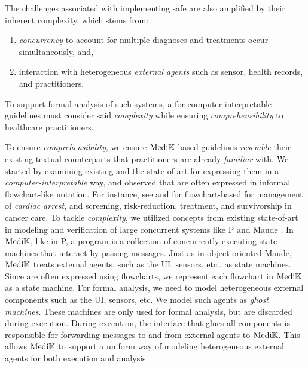 The challenges associated with implementing safe \CDSSs{} are
also amplified by their inherent complexity, which stems from:
\begin{enumerate}[label=(\roman*)]
  \item \emph{concurrency} to account for multiple diagnoses and treatments
    occur simultaneously, and,
  \item interaction with heterogeneous \emph{external agents} such as sensor,
    health records, and practitioners.
\end{enumerate}
To support formal analysis of such systems, a \DSL{} for
computer interpretable guidelines must consider said \emph{complexity}
while ensuring \emph{comprehensibility} to healthcare practitioners.

To ensure \emph{comprehensibility}, we ensure $\text{Medi}\mathbb{K}{}{}$-based guidelines \emph{resemble}
their existing textual counterparts that practitioners are already
\emph{familiar} with. We started by examining existing \BPGs{} and the
state-of-art \DSLs{} for expressing them in a \emph{computer-interpretable} way, and observed that
\BPGs{} are often expressed in informal flowchart-like notation. For instance,
see \cite{AHAFlowcharts} and \cite{CancerCareFlowcharts} for flowchart-based \BPGs{} for management of \emph{cardiac arrest}, and
screening, risk-reduction, treatment, and survivorship in cancer care.
To tackle \emph{complexity},
we utilized concepts from existing state-of-art in modeling
and verification of large concurrent systems like P \cite{DesaiPLDI13} and Maude
\cite{MaudeBook}.
In $\text{Medi}\mathbb{K}{}$, like in P, a program is a collection of concurrently executing state
machines that interact by passing messages. Just as in object-oriented Maude,
$\text{Medi}\mathbb{K}{}{}$ treats external agents, such as the UI, sensors, etc., as state machines.
Since \BPGs{} are often expressed using flowcharts, we represent each flowchart
in $\text{Medi}\mathbb{K}{}{}$ as a state machine. For formal analysis, we need to model
heterogeneous external components such as the UI, sensors, etc.
We model such agents as \emph{ghost machines}.
These machines are only used for formal analysis, but are discarded during
execution. During execution, the interface that glues all components
is responsible for forwarding messages to and from external agents to $\text{Medi}\mathbb{K}{}$.
This allows $\text{Medi}\mathbb{K}{}$ to support a uniform way of
modeling heterogeneous external agents for both execution and analysis.

